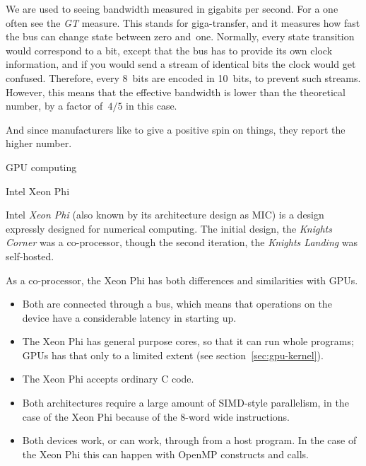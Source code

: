  We are used to seeing bandwidth
measured in gigabits per second. For a  one often
see the \emph{GT} measure. This stands
for giga-transfer, and it measures how fast the bus can change state
between zero and~one.
Normally, every state transition would correspond to a bit, except that
the bus has to provide its own clock information, and if you would send a stream
of identical bits the clock would get confused. Therefore, every 8~bits
are encoded in 10~bits, to prevent such streams. However, this means
that the effective bandwidth is lower than the theoretical number,
by a factor of~$4/5$ in this case.

And since manufacturers like to give a positive spin on things,
they report the higher number.

 {GPU computing}
\label{sec:gpu}


 {Intel Xeon Phi}


Intel \emph{Xeon Phi}
(also known by its architecture design as \ac{MIC})
is a design expressly designed for numerical computing.
The initial design, the
%
\emph{Knights Corner}%
was a co-processor, though the second iteration, the
\emph{Knights Landing}%
was self-hosted.

As a co-processor, the Xeon Phi has both differences and similarities with \acp{GPU}.
\begin{itemize}
\item Both are connected through a  bus, which means
  that operations on the device have a considerable latency in
  starting up.
\item The Xeon Phi has general purpose cores, so that it can run whole
  programs; \acp{GPU} has that only to a limited extent (see
  section~\ref{sec:gpu-kernel}).
\item The Xeon Phi accepts ordinary C code.
\item Both architectures require a large amount of SIMD-style
  parallelism, in the case of the Xeon Phi because of the 8-word wide
   instructions.
\item Both devices work, or can work, through 
  from a host program. In the case of the Xeon Phi this can happen
  with OpenMP constructs and  calls.
\end{itemize}

